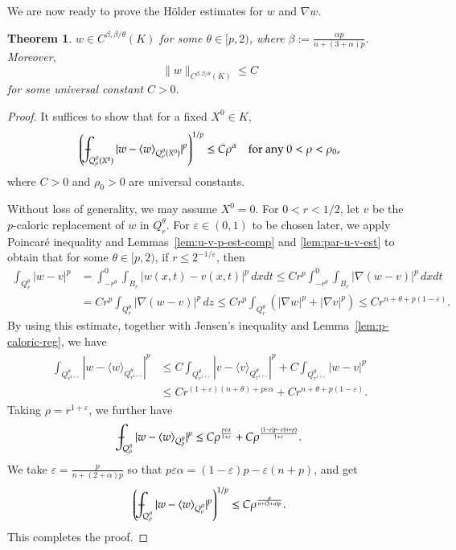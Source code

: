 \documentclass[11pt,oneside,english]{amsart}
\newcommand{\e}{\varepsilon}
\newcommand{\al}{\alpha}
\newcommand{\be}{\beta}
\newcommand{\D}{\nabla}
\numberwithin{equation}{section}
\def\Xint#1{\mathchoice
  {\XXint\displaystyle\textstyle{#1}}%
  {\XXint\textstyle\scriptstyle{#1}}%
  {\XXint\scriptstyle\scriptscriptstyle{#1}}%
  {\XXint\scriptscriptstyle\scriptscriptstyle{#1}}%
  \!\int}
\def\XXint#1#2#3{{\setbox0=\hbox{$#1{#2#3}{\int}$}
    \vcenter{\hbox{$#2#3$}}\kern-.5\wd0}}
\def\dashint{\Xint-}
\newtheorem{theorem}{Theorem}
\theoremstyle{plain}
\numberwithin{equation}{section}
\newcommand{\mean}[1]{\langle{#1}\rangle}
\begin{document}
We are now ready to prove the Hölder estimates for $w$ and $\D w$.

\begin{theorem}\label{thm:par-holder-sing}
$w\in C^{\be,\be/\theta}(K)$ for some $\theta\in[p,2)$, where $\be:=\frac{\al p}{n+(3+\al)p}$. Moreover, 
 $$
 \|w\|_{C^{\be,\be/\theta}(K)}\le C $$
 for some universal constant $C>0$.
\end{theorem}

\begin{proof}
It suffices to show that for a fixed $X^0\in K$,
$$
\left(\dashint_{Q^\theta_\rho(X^0)}|w-\mean{w}_{Q^\theta_\rho(X^0)}|^p\right)^{1/p}\le C\rho^\al \quad\text{for any }0<\rho<\rho_0,
$$
where $C>0$ and $\rho_0>0$ are universal constants.

Without loss of generality, we may assume $X^0=0$. For $0<r<1/2$, let $v$ be the $p$-caloric replacement of $w$ in $Q_r^\theta$. For $\e\in(0,1)$ to be chosen later, we apply Poincaré inequality and Lemmas~\ref{lem:u-v-p-est-comp} and \ref{lem:par-u-v-est} to obtain that for some $\theta\in[p,2)$, if $r\le 2^{-1/\e}$, then
\begin{align*}
    \int_{Q_r^\theta}|w-v|^p&=\int_{-r^\theta}^0\int_{B_r}|w(x,t)-v(x,t)|^p\,dxdt\le Cr^p\int_{-r^\theta}^0\int_{B_r}|\D (w-v)|^p\,dxdt\\
    &=Cr^p\int_{Q_r^\theta}|\D(w-v)|^p\,dz\le Cr^p\int_{Q_r^\theta}(|\D w|^p+|\D v|^p) \le Cr^{n+\theta+p(1-\e)}.
\end{align*}
By using this estimate, together with Jensen's inequality and Lemma~\ref{lem:p-caloric-reg}, we have
\begin{align}\label{eq:par-holder-ineq-sing}\begin{split}
    \int_{Q^\theta_{r^{1+\e}}}|w-\mean{w}_{Q^\theta_{r^{1+\e}}}|^p
    &\le C\int_{Q^\theta_{r^{1+\e}}}|v-\mean{v}_{Q^\theta_{r^{1+\e}}}|^p+C\int_{Q^\theta_{r^{1+\e}}}|w-v|^p\\
    &\le Cr^{(1+\e)(n+\theta)+p\e\al}+Cr^{n+\theta+p(1-\e)}.\end{split}
\end{align}
Taking $\rho=r^{1+\e}$, we further have
$$
\dashint_{Q_\rho^\theta}|w-\mean{w}_{Q^\theta_\rho}|^p\le C\rho^{\frac{p\e\al }{1+\e }}+C\rho^{\frac{(1-\e) p-\e(n+p)}{1+\e}}.
$$
We take $\e=\frac{p}{n+(2+\al)p}$ so that $p\e\al=(1-\e)p-\e(n+p)$, and get
$$
\left(\dashint_{Q_\rho^\theta}|w-\mean{w}_{Q^\theta_\rho}|^p\right)^{1/p}\le C\rho^{\frac{\al}{n+(3+\al)p}}.
$$
This completes the proof.    
\end{proof}
\end{document}
